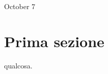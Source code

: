 \documentclass[11pt,letterpaper]{article}
\begin{document}
\logoPNG

{\Huge October  7}

\section*{Prima sezione}
qualcosa.
\end{document}
